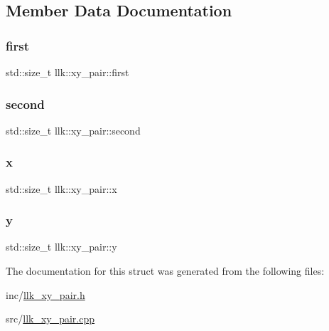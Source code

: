 \subsection{Member Data Documentation}
\mbox{\label{structllk_1_1xy__pair_acec3f70be79e2e1ccbf2e40853a85101}} 
\subsubsection{\texorpdfstring{first}{first}}
{\footnotesize\ttfamily std\+::size\+\_\+t llk\+::xy\+\_\+pair\+::first}

\mbox{\label{structllk_1_1xy__pair_ab150c1eaffd7963239c139d330851e67}} 
\subsubsection{\texorpdfstring{second}{second}}
{\footnotesize\ttfamily std\+::size\+\_\+t llk\+::xy\+\_\+pair\+::second}

\mbox{\label{structllk_1_1xy__pair_a0529eda73df053ddcc7662187ca57e23}} 
\subsubsection{\texorpdfstring{x}{x}}
{\footnotesize\ttfamily std\+::size\+\_\+t llk\+::xy\+\_\+pair\+::x}

\mbox{\label{structllk_1_1xy__pair_a95998ff2c605752606fea129d2adb409}} 
\subsubsection{\texorpdfstring{y}{y}}
{\footnotesize\ttfamily std\+::size\+\_\+t llk\+::xy\+\_\+pair\+::y}



The documentation for this struct was generated from the following files\+:\begin{DoxyCompactItemize}
\item 
inc/\hyperlink{llk__xy__pair_8h}{llk\+\_\+xy\+\_\+pair.\+h}\item 
src/\hyperlink{llk__xy__pair_8cpp}{llk\+\_\+xy\+\_\+pair.\+cpp}\end{DoxyCompactItemize}
